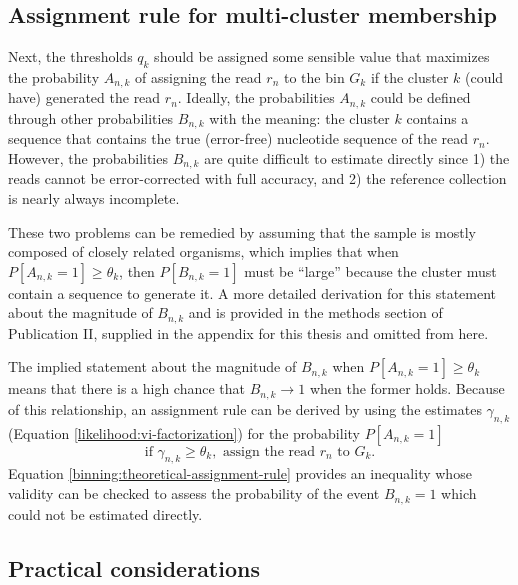 \documentclass[officiallayout]{tktla}
\begin{document}
\subsection{Assignment rule for multi-cluster membership}

Next, the thresholds $q_{k}$ should be assigned some sensible value
that maximizes the probability $A_{n, k}$ of assigning the read
$r_{n}$ to the bin $G_{k}$ if the cluster $k$ (could have) generated
the read $r_{n}$. Ideally, the probabilities $A_{n, k}$ could be
defined through other probabilities $B_{n, k}$ with the meaning: the
cluster $k$ contains a sequence that contains the true (error-free)
nucleotide sequence of the read $r_{n}$. However, the probabilities
$B_{n, k}$ are quite difficult to estimate directly since 1) the reads
cannot be error-corrected with full accuracy, and 2) the reference
collection is nearly always incomplete.

These two problems can be remedied by assuming that the sample is
mostly composed of closely related organisms, which implies that when
$P\left[A_{n, k} = 1\right] \geq \theta_{k}$, then $P\left[B_{n, k} =
  1\right]$ must be ``large'' because the cluster must contain a
sequence to generate it. A more detailed derivation for this statement
about the magnitude of $B_{n, k}$ and is provided in the methods
section of Publication II, supplied in the appendix for this thesis
and omitted from here.

The implied statement about the magnitude of $B_{n, k}$ when
$P\left[A_{n, k} = 1\right] \geq \theta_{k}$ means that there is a
high chance that $B_{n, k} \rightarrow 1$ when the former
holds. Because of this relationship, an assignment rule can be derived
by using the estimates $\gamma_{n, k}$ (Equation
\eqref{likelihood:vi-factorization}) for the probability $P\left[A_{n,
    k} = 1\right]$
\begin{equation}
  \label{binning:theoretical-assignment-rule}
  \text{if } \gamma_{n, k} \geq \theta_{k}, \text{ assign the read } r_{n} \text{ to } G_{k}.
\end{equation}
Equation \eqref{binning:theoretical-assignment-rule} provides an
inequality whose validity can be checked to assess the probability of
the event $B_{n, k} = 1$ which could not be estimated directly.

\subsection{Practical considerations}
\end{document}

